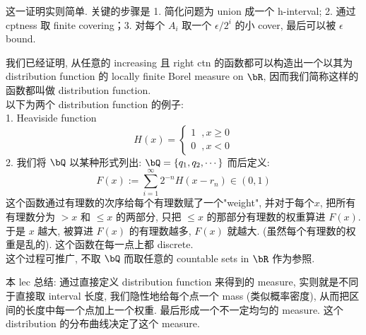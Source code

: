 \documentclass[lang=cn,11pt]{elegantbook}
\begin{document}
\begin{remark}
    这一证明实则简单. 关键的步骤是 1. 简化问题为 union 成一个 h-interval; 2. 通过 cptness 取 finite covering；3. 对每个 $A_i $ 取一个 $\epsilon / 2^i$ 的小 cover, 最后可以被 $\epsilon$ bound.
\end{remark}



\begin{example}
我们已经证明, 从任意的 increasing 且 right ctn 的函数都可以构造出一个以其为 distribution function 的 locally finite Borel measure on $\bR$, 因而我们简称这样的函数都叫做 distribution function.\\
以下为两个 distribution function 的例子:\\
1.  Heaviside function $$H(x)  = \begin{cases}
    1 \;\; ,x\geq 0\\
    0 \;\; ,x < 0
\end{cases}    $$
2. 我们将 $\bQ$ 以某种形式列出: $\bQ = \{q_1, q_2, \cdots\}$
而后定义:
$$
F(x) := \sum_{i = 1} ^\infty 2^{-n} H(x - r_n)   \in (0,1)
$$
这个函数通过有理数的次序给每个有理数赋了一个"weight", 并对于每个$x$, 把所有有理数分为 $> x$ 和 $\leq x$ 的两部分, 只把 $\leq x$ 的那部分有理数的权重算进 $F(x)$. 于是 $x$ 越大, 被算进 $F(x)$ 的有理数越多, $F(x)$ 就越大. (虽然每个有理数的权重是乱的). 这个函数在每一点上都 discrete.\\
这个过程可推广, 不取 $\bQ$ 而取任意的 countable sets in $\bR$ 作为参照.
\end{example}





本 lec 总结: 通过直接定义 distribution function 来得到的 measure, 实则就是不同于直接取 interval 长度, 我们隐性地给每个点一个 mass (类似概率密度), 从而把区间的长度中每一个点加上一个权重. 最后形成一个不一定均匀的 measure. 这个 distribution 的分布曲线决定了这个 measure.
\end{document}
